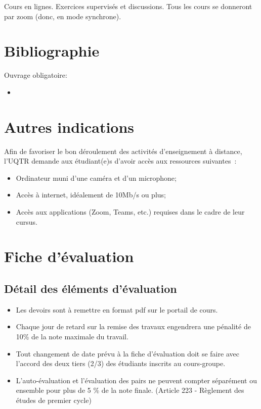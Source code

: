 \documentclass[12pt,undergraduate]{uqtrplandecours}
\begin{document}
Cours en lignes. Exercices supervisés et discussions.
Tous les cours se donneront par zoom (donc, en mode synchrone).

\section{Bibliographie}

Ouvrage obligatoire:
\begin{itemize}
  \item {}
\end{itemize}


\section{Autres indications}

Afin de favoriser le bon déroulement des activités d'enseignement à distance,
  l'UQTR demande aux étudiant(e)s d'avoir accès aux ressources suivantes :
\begin{itemize}
  \item Ordinateur muni d'une caméra et d'un microphone;
  \item Accès à internet, idéalement de 10Mb/s ou plus;
  \item Accès aux applications (Zoom, Teams, etc.) requises dans le cadre de leur cursus.
\end{itemize}


\section{Fiche d'évaluation}

\subsection*{Détail des éléments d'évaluation}

\printevaltable 

\begin{itemize}
  \item Les devoirs sont à remettre en format pdf sur le portail de cours.
  \item Chaque jour de retard sur la remise des travaux
        engendrera une pénalité de 10\% de la note maximale du travail.
  \item Tout changement de date prévu à la fiche d’évaluation doit se faire
        avec l’accord des deux tiers (2/3) des étudiants inscrits au cours-groupe.
  \item L’auto-évaluation et l’évaluation des pairs ne peuvent compter
        séparément ou ensemble pour plus de 5 \% de la note finale.
        (Article 223 - Règlement des études de premier cycle)
\end{itemize}
\end{document}
